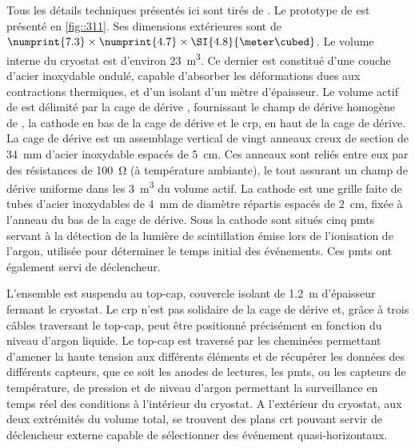       Tous les détails techniques présentés ici sont tirés de \cite{Aimard2018}. Le prototype de \TOO{} est présenté en \autoref{fig::311}. Ses dimensions extérieures sont de $\numprint{7.3}\times\numprint{4.7}\times\SI{4.8}{\meter\cubed}$. Le volume interne du cryostat
      est d'environ \SI{23}{\meter\cubed}. Ce dernier est constitué d'une couche d'acier inoxydable ondulé, capable d'absorber les déformations dues aux contractions thermiques, et d'un isolant d'un mètre d'épaisseur. Le volume actif de \TOO{} est délimité par la cage de dérive , fournissant le champ de dérive homogène de \driftfield{}, la cathode en bas de la cage de dérive et le \gls{crp}, en haut de la cage de dérive. La cage de dérive est un assemblage vertical de vingt anneaux creux de section de \SI{34}{\milli\meter} d'acier inoxydable espacés de \SI{5}{\centi\meter}. Ces anneaux sont reliés entre eux par des résistances de \SI{100}{\ohm} (à température ambiante), le tout assurant un champ de dérive uniforme dans les \SI{3}{\meter\cubed} du volume actif. La cathode est une grille faite de tubes d'acier inoxydables de \SI{4}{\milli\meter} de diamètre répartis espacés de \SI{2}{\centi\meter}, fixée à l'anneau du bas de la cage de dérive. Sous la cathode sont situés cinq \glspl{pmt} servant à la détection de la lumière de scintillation émise lors de l'ionisation de l'argon, utilisée pour déterminer le temps initial des événements. Ces \glspl{pmt} ont également servi de déclencheur. 

      L'ensemble est suspendu au top-cap, couvercle isolant de \SI{1.2}{\meter} d'épaisseur fermant le cryostat. Le \gls{crp} n'est pas solidaire de la cage de dérive et, grâce à trois câbles traversant le top-cap, peut être positionné précisément en fonction du niveau d'argon liquide. Le top-cap est traversé par les cheminées permettant d'amener la haute tension aux différents éléments et de récupérer les données des différents capteurs, que ce soit les anodes de lectures, les \glspl{pmt}, ou les capteurs de température, de pression et de niveau d'argon permettant la surveillance en temps réel des conditions à l'intérieur du cryostat. A l'extérieur du cryostat, aux deux extrémités du volume total, se trouvent des plans \gls{crt} pouvant servir de déclencheur externe capable de sélectionner des événement quasi-horizontaux.

